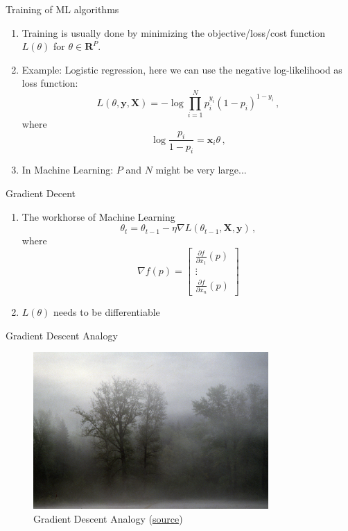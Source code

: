 \documentclass[10pt]{beamer}
\begin{document}
\begin{frame}{Training of ML algorithms}

\begin{enumerate}
\item Training is usually done by minimizing the objective/loss/cost function $L(\theta)$ for $\theta \in \mathbf{R}^P$.
\item Example: Logistic regression, here we can use the {\color{uured} negative} log-likelihood as loss function:
\[
L(\theta, \mathbf{y}, \mathbf{X}) = - \log \prod^N_{i=1} p_i^{y_i} (1 - p_i)^{1-y_i} \,,
\]
where
\[
\log \frac{p_i}{1-p_i} = \mathbf{x}_i \theta  \,,
\]\pause
\item In Machine Learning: $P$ and $N$ might be very large...
\end{enumerate}


\end{frame}



\begin{frame}{Gradient Decent}

\begin{enumerate}
\item The workhorse of Machine Learning
\[
\theta_t = \theta_{t-1} - \eta \nabla L(\theta_{t-1}, \mathbf{X}, \mathbf{y})\,,
\]
where
\[
\nabla f(p)=\begin{bmatrix}{\frac {\partial f}{\partial x_{1}}}(p)\\\vdots \\{\frac {\partial f}{\partial x_{n}}}(p)\end{bmatrix}
\]
\item $L(\theta)$ needs to be differentiable
\end{enumerate}

\end{frame}


\begin{frame}{Gradient Descent Analogy}

\begin{figure}[h]
\caption{Gradient Descent Analogy (\href{https://en.wikipedia.org/wiki/Gradient_descent}{source})}
\centering
\includegraphics[width=0.8\textwidth]{figs/Okanogan-Wenatchee_National_Forest_morning_fog_shrouds_trees.jpg}
\end{figure}


\end{frame}
\end{document}
